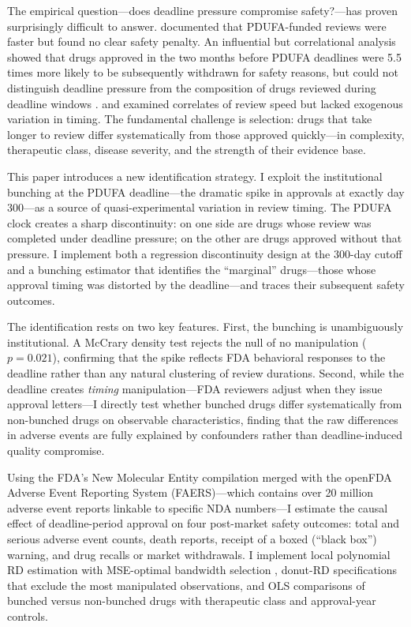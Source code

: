 \documentclass[12pt]{article}
\begin{document}
The empirical question---does deadline pressure compromise safety?---has proven surprisingly difficult to answer. \citet{carpenter2008approval} documented that PDUFA-funded reviews were faster but found no clear safety penalty. An influential but correlational analysis showed that drugs approved in the two months before PDUFA deadlines were 5.5 times more likely to be subsequently withdrawn for safety reasons, but could not distinguish deadline pressure from the composition of drugs reviewed during deadline windows \citep{downing2017postmarket}. \citet{berndt2005speed} and \citet{olson1997firms} examined correlates of review speed but lacked exogenous variation in timing. The fundamental challenge is selection: drugs that take longer to review differ systematically from those approved quickly---in complexity, therapeutic class, disease severity, and the strength of their evidence base.

This paper introduces a new identification strategy. I exploit the institutional bunching at the PDUFA deadline---the dramatic spike in approvals at exactly day 300---as a source of quasi-experimental variation in review timing. The PDUFA clock creates a sharp discontinuity: on one side are drugs whose review was completed under deadline pressure; on the other are drugs approved without that pressure. I implement both a regression discontinuity design at the 300-day cutoff and a bunching estimator that identifies the ``marginal'' drugs---those whose approval timing was distorted by the deadline---and traces their subsequent safety outcomes.

The identification rests on two key features. First, the bunching is unambiguously institutional. A McCrary density test rejects the null of no manipulation ($p = 0.021$), confirming that the spike reflects FDA behavioral responses to the deadline rather than any natural clustering of review durations. Second, while the deadline creates \textit{timing} manipulation---FDA reviewers adjust when they issue approval letters---I directly test whether bunched drugs differ systematically from non-bunched drugs on observable characteristics, finding that the raw differences in adverse events are fully explained by confounders rather than deadline-induced quality compromise.

Using the FDA's New Molecular Entity compilation merged with the openFDA Adverse Event Reporting System (FAERS)---which contains over 20 million adverse event reports linkable to specific NDA numbers---I estimate the causal effect of deadline-period approval on four post-market safety outcomes: total and serious adverse event counts, death reports, receipt of a boxed (``black box'') warning, and drug recalls or market withdrawals. I implement local polynomial RD estimation with MSE-optimal bandwidth selection \citep{calonico2014robust}, donut-RD specifications that exclude the most manipulated observations, and OLS comparisons of bunched versus non-bunched drugs with therapeutic class and approval-year controls.
\end{document}

